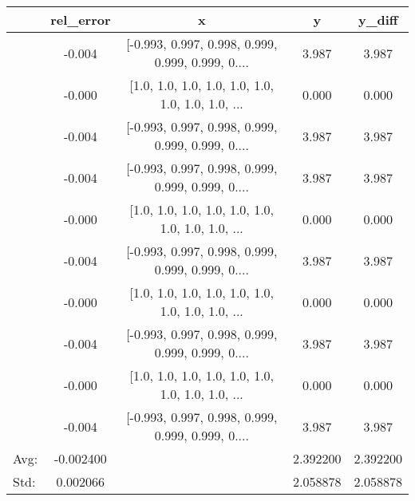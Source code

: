 \documentclass[10pt,onside]{article}
\begin{document}
\begin{description}
\begin{tabular}{lcccc}
\toprule
{} &  rel\_error &                                                  x &      y &  y\_diff \\
\midrule
&     -0.004 &  [-0.993, 0.997, 0.998, 0.999, 0.999, 0.999, 0.... &  3.987 &   3.987 \\
&     -0.000 &  [1.0, 1.0, 1.0, 1.0, 1.0, 1.0, 1.0, 1.0, 1.0, ... &  0.000 &   0.000 \\
&     -0.004 &  [-0.993, 0.997, 0.998, 0.999, 0.999, 0.999, 0.... &  3.987 &   3.987 \\
&     -0.004 &  [-0.993, 0.997, 0.998, 0.999, 0.999, 0.999, 0.... &  3.987 &   3.987 \\
&     -0.000 &  [1.0, 1.0, 1.0, 1.0, 1.0, 1.0, 1.0, 1.0, 1.0, ... &  0.000 &   0.000 \\
&     -0.004 &  [-0.993, 0.997, 0.998, 0.999, 0.999, 0.999, 0.... &  3.987 &   3.987 \\
&     -0.000 &  [1.0, 1.0, 1.0, 1.0, 1.0, 1.0, 1.0, 1.0, 1.0, ... &  0.000 &   0.000 \\
&     -0.004 &  [-0.993, 0.997, 0.998, 0.999, 0.999, 0.999, 0.... &  3.987 &   3.987 \\
&     -0.000 &  [1.0, 1.0, 1.0, 1.0, 1.0, 1.0, 1.0, 1.0, 1.0, ... &  0.000 &   0.000 \\
&     -0.004 &  [-0.993, 0.997, 0.998, 0.999, 0.999, 0.999, 0.... &  3.987 &   3.987 \\
\bottomrule
Avg: & -0.002400 &  & 2.392200 & 2.392200 \\
Std: & 0.002066 &  & 2.058878 & 2.058878 \\
\bottomrule
\end{tabular}



\end{description}
\end{document}
